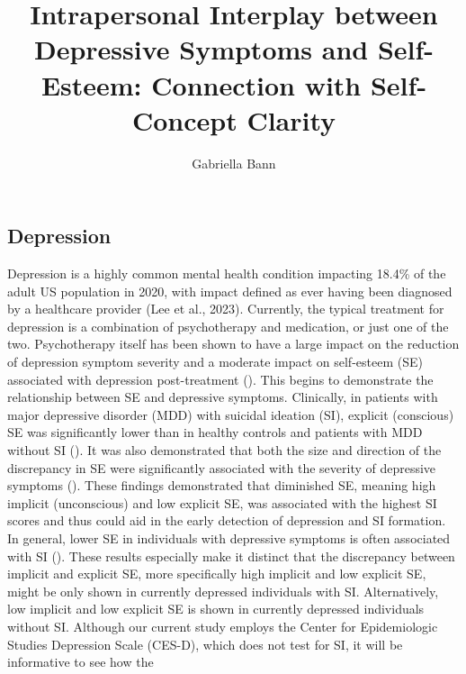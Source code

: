 \documentclass[
  man,
  floatsintext,
  longtable,
  nolmodern,
  notxfonts,
  notimes,
  colorlinks=true,linkcolor=blue,citecolor=blue,urlcolor=blue]{apa7}
\title{Intrapersonal Interplay between Depressive Symptoms and
Self-Esteem: Connection with Self-Concept Clarity}
\author{Gabriella Bann}
\affiliation{
{Division of the Social Sciences, University of Chicago}}
\begin{document}
\maketitle


\setcounter{secnumdepth}{-\maxdimen} %

\setlength\LTleft{0pt}


\subsection{Depression}\label{depression}

Depression is a highly common mental health condition impacting 18.4\%
of the adult US population in 2020, with impact defined as ever having
been diagnosed by a healthcare provider (Lee et al., 2023). Currently,
the typical treatment for depression is a combination of psychotherapy
and medication, or just one of the two. Psychotherapy itself has been
shown to have a large impact on the reduction of depression symptom
severity and a moderate impact on self-esteem (SE) associated with
depression post-treatment
().
This begins to demonstrate the relationship between SE and depressive
symptoms. Clinically, in patients with major depressive disorder (MDD)
with suicidal ideation (SI), explicit (conscious) SE was significantly
lower than in healthy controls and patients with MDD without SI
(). It was also
demonstrated that both the size and direction of the discrepancy in SE
were significantly associated with the severity of depressive symptoms
(). These findings
demonstrated that diminished SE, meaning high implicit (unconscious) and
low explicit SE, was associated with the highest SI scores and thus
could aid in the early detection of depression and SI formation. In
general, lower SE in individuals with depressive symptoms is often
associated with SI (). These results especially make it distinct that the discrepancy
between implicit and explicit SE, more specifically high implicit and
low explicit SE, might be only shown in currently depressed individuals
with SI. Alternatively, low implicit and low explicit SE is shown in
currently depressed individuals without SI. Although our current study
employs the Center for Epidemiologic Studies Depression Scale (CES-D),
which does not test for SI, it will be informative to see how the
\end{document}
